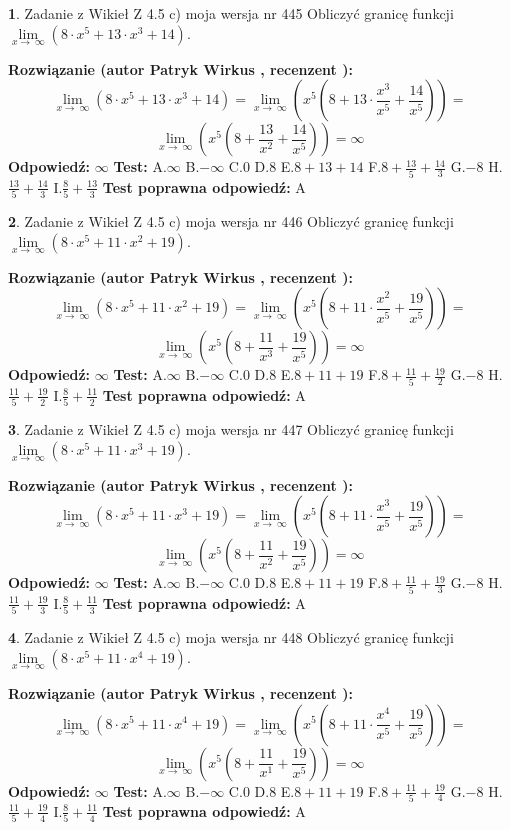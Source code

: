 \documentclass[12pt, a4paper]{article}
\theoremstyle{definition} %
\newtheorem{zad}{}
\newcommand{\zadStart}[1]{\begin{zad}#1\newline}
\newcommand{\zadStop}{\end{zad}}
\newcommand{\rozwStart}[2]{\noindent \textbf{Rozwiązanie (autor #1 , recenzent #2): }\newline}
\newcommand{\rozwStop}{\newline}
\newcommand{\odpStart}{\noindent \textbf{Odpowiedź:}\newline}
\newcommand{\odpStop}{\newline}
\newcommand{\testStart}{\noindent \textbf{Test:}\newline}
\newcommand{\testStop}{\newline}
\newcommand{\kluczStart}{\noindent \textbf{Test poprawna odpowiedź:}\newline}
\newcommand{\kluczStop}{\newline}
\begin{document}
\zadStart{Zadanie z Wikieł Z 4.5 c) moja wersja nr 445}
Obliczyć granicę funkcji  $\lim\limits_{x\to\ \infty}(8 \cdot x^{5}+13 \cdot x^{3}+14)$.
\zadStop
\rozwStart{Patryk Wirkus}{}
$$\lim\limits_{x\to\ \infty}(8 \cdot x^{5}+13 \cdot x^{3}+14) = \lim\limits_{x\to\ \infty}(x^{5}(8 +13 \cdot \frac{x^{3}}{x^{5}}+\frac{14}{x^{5}})) =$$ $$\lim\limits_{x\to\ \infty}(x^{5}(8 +\frac{13}{x^{2}}+\frac{14}{x^{5}})) =\infty$$
\rozwStop
\odpStart
$\infty$
\odpStop
\testStart
A.$\infty$ B.$-\infty$ C.$0$ D.$8$ E.$8 + 13 + 14$
F.$8+\frac{13}{5}+\frac{14}{3}$ G.$-8$
H.$\frac{13}{5}+\frac{14}{3}$
I.$\frac{8}{5}+\frac{13}{3}$
\testStop
\kluczStart
A
\kluczStop



\zadStart{Zadanie z Wikieł Z 4.5 c) moja wersja nr 446}
Obliczyć granicę funkcji  $\lim\limits_{x\to\ \infty}(8 \cdot x^{5}+11 \cdot x^{2}+19)$.
\zadStop
\rozwStart{Patryk Wirkus}{}
$$\lim\limits_{x\to\ \infty}(8 \cdot x^{5}+11 \cdot x^{2}+19) = \lim\limits_{x\to\ \infty}(x^{5}(8 +11 \cdot \frac{x^{2}}{x^{5}}+\frac{19}{x^{5}})) =$$ $$\lim\limits_{x\to\ \infty}(x^{5}(8 +\frac{11}{x^{3}}+\frac{19}{x^{5}})) =\infty$$
\rozwStop
\odpStart
$\infty$
\odpStop
\testStart
A.$\infty$ B.$-\infty$ C.$0$ D.$8$ E.$8 + 11 + 19$
F.$8+\frac{11}{5}+\frac{19}{2}$ G.$-8$
H.$\frac{11}{5}+\frac{19}{2}$
I.$\frac{8}{5}+\frac{11}{2}$
\testStop
\kluczStart
A
\kluczStop



\zadStart{Zadanie z Wikieł Z 4.5 c) moja wersja nr 447}
Obliczyć granicę funkcji  $\lim\limits_{x\to\ \infty}(8 \cdot x^{5}+11 \cdot x^{3}+19)$.
\zadStop
\rozwStart{Patryk Wirkus}{}
$$\lim\limits_{x\to\ \infty}(8 \cdot x^{5}+11 \cdot x^{3}+19) = \lim\limits_{x\to\ \infty}(x^{5}(8 +11 \cdot \frac{x^{3}}{x^{5}}+\frac{19}{x^{5}})) =$$ $$\lim\limits_{x\to\ \infty}(x^{5}(8 +\frac{11}{x^{2}}+\frac{19}{x^{5}})) =\infty$$
\rozwStop
\odpStart
$\infty$
\odpStop
\testStart
A.$\infty$ B.$-\infty$ C.$0$ D.$8$ E.$8 + 11 + 19$
F.$8+\frac{11}{5}+\frac{19}{3}$ G.$-8$
H.$\frac{11}{5}+\frac{19}{3}$
I.$\frac{8}{5}+\frac{11}{3}$
\testStop
\kluczStart
A
\kluczStop



\zadStart{Zadanie z Wikieł Z 4.5 c) moja wersja nr 448}
Obliczyć granicę funkcji  $\lim\limits_{x\to\ \infty}(8 \cdot x^{5}+11 \cdot x^{4}+19)$.
\zadStop
\rozwStart{Patryk Wirkus}{}
$$\lim\limits_{x\to\ \infty}(8 \cdot x^{5}+11 \cdot x^{4}+19) = \lim\limits_{x\to\ \infty}(x^{5}(8 +11 \cdot \frac{x^{4}}{x^{5}}+\frac{19}{x^{5}})) =$$ $$\lim\limits_{x\to\ \infty}(x^{5}(8 +\frac{11}{x^{1}}+\frac{19}{x^{5}})) =\infty$$
\rozwStop
\odpStart
$\infty$
\odpStop
\testStart
A.$\infty$ B.$-\infty$ C.$0$ D.$8$ E.$8 + 11 + 19$
F.$8+\frac{11}{5}+\frac{19}{4}$ G.$-8$
H.$\frac{11}{5}+\frac{19}{4}$
I.$\frac{8}{5}+\frac{11}{4}$
\testStop
\kluczStart
A
\kluczStop
\end{document}
